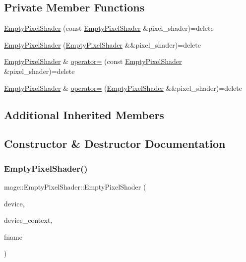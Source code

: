 \subsection*{Private Member Functions}
\begin{DoxyCompactItemize}
\item 
\hyperlink{classmage_1_1_empty_pixel_shader_a5eaa8370d531fcc7877cc706bc8fbcce}{Empty\+Pixel\+Shader} (const \hyperlink{classmage_1_1_empty_pixel_shader}{Empty\+Pixel\+Shader} \&pixel\+\_\+shader)=delete
\item 
\hyperlink{classmage_1_1_empty_pixel_shader_aca9bcffa5b5bb24c508e0d7cb0d531f9}{Empty\+Pixel\+Shader} (\hyperlink{classmage_1_1_empty_pixel_shader}{Empty\+Pixel\+Shader} \&\&pixel\+\_\+shader)=delete
\item 
\hyperlink{classmage_1_1_empty_pixel_shader}{Empty\+Pixel\+Shader} \& \hyperlink{classmage_1_1_empty_pixel_shader_a7702fdae1d752ed422d1508e6ee08479}{operator=} (const \hyperlink{classmage_1_1_empty_pixel_shader}{Empty\+Pixel\+Shader} \&pixel\+\_\+shader)=delete
\item 
\hyperlink{classmage_1_1_empty_pixel_shader}{Empty\+Pixel\+Shader} \& \hyperlink{classmage_1_1_empty_pixel_shader_a5eee18735b5bc109ca63a913fa8e374d}{operator=} (\hyperlink{classmage_1_1_empty_pixel_shader}{Empty\+Pixel\+Shader} \&\&pixel\+\_\+shader)=delete
\end{DoxyCompactItemize}
\subsection*{Additional Inherited Members}


\subsection{Constructor \& Destructor Documentation}
\hypertarget{classmage_1_1_empty_pixel_shader_a7ef10491614de6eaa31d7845094d34a1}{}\label{classmage_1_1_empty_pixel_shader_a7ef10491614de6eaa31d7845094d34a1} 
\subsubsection{\texorpdfstring{Empty\+Pixel\+Shader()}{EmptyPixelShader()}\hspace{0.1cm}{\footnotesize\ttfamily [1/3]}}
{\footnotesize\ttfamily mage\+::\+Empty\+Pixel\+Shader\+::\+Empty\+Pixel\+Shader (\begin{DoxyParamCaption}\item[{I\+D3\+D11\+Device2 $\ast$}]{device,  }\item[{I\+D3\+D11\+Device\+Context2 $\ast$}]{device\+\_\+context,  }\item[{const wstring \&}]{fname }\end{DoxyParamCaption})}

